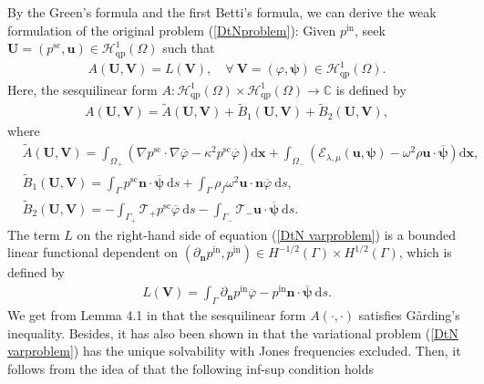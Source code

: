 \documentclass[final,3p,times]{elsarticle}
\begin{document}
By the Green's formula and the first Betti's formula, we can derive the weak formulation of the original problem (\ref{DtNproblem}): Given $p^\mathrm{in}$, seek $\boldsymbol{U}=\left(p^\mathrm{sc}, \boldsymbol{u}\right) \in \mathscr{H}^1_\mathrm{qp}(\Omega)$ such that
\begin{align}\label{DtN varproblem}
	A(\boldsymbol{U}, \boldsymbol{V})=L(\boldsymbol{V}),\quad \forall~ \boldsymbol{V}=(\varphi, \boldsymbol{\psi}) \in \mathscr{H}^1_\mathrm{qp}(\Omega).
\end{align}
Here, the sesquilinear form $A: \mathscr{H}^1_\mathrm{qp}(\Omega) \times \mathscr{H}^1_\mathrm{qp}(\Omega) \rightarrow \mathbb{C}$ is  defined by 
\begin{align}\label{DtN varleft}
	A(\boldsymbol{U}, \boldsymbol{V})
	=\widetilde{A}(\boldsymbol{U}, \boldsymbol{V})
	+ \widetilde{B}_1(\boldsymbol{U}, \boldsymbol{V})
	+ \widetilde{B}_2(\boldsymbol{U}, \boldsymbol{V}),
\end{align}
where
\begin{align*}
	& \widetilde{A}(\boldsymbol{U}, \boldsymbol{V})=\int_{\Omega_+}\left(\nabla p^\mathrm{sc} \cdot \nabla \overline{\varphi}-\kappa^2 p^\mathrm{sc} \overline{\varphi}\right) \mathrm{d} \boldsymbol{x}
	+ \int_{\Omega_-}\left(\mathcal{E}_{\lambda,    \mu}(\boldsymbol{u}, \boldsymbol{\psi})- \omega^2\rho \boldsymbol{u} \cdot \overline{\boldsymbol{\psi}}\right) \mathrm{d} \boldsymbol{x},\\
	& \widetilde{B}_1(\boldsymbol{U}, \boldsymbol{V})
	= \int_{\Gamma} p^\mathrm{sc} \boldsymbol{n} \cdot \overline{\boldsymbol{\psi}} \mathrm{~d}s
	+ \int_{\Gamma} \rho_f \omega^2 \boldsymbol{u} \cdot \boldsymbol{n} \overline{\varphi} \mathrm{~d}s, \\
	& \widetilde{B}_2(\boldsymbol{U}, \boldsymbol{V})=-\int_{\Gamma_+} \mathscr{T}_+ p^\mathrm{sc} \overline{\varphi} \mathrm{~d}s
	- \int_{\Gamma_-} \mathscr{T}_- \boldsymbol{u} \cdot \overline{\boldsymbol{\psi}} \mathrm{~d}s.
\end{align*}
The term $L$ on the right-hand side of equation (\ref{DtN varproblem}) is a bounded linear functional dependent on  $\left(\partial_{\bm{n}} p^\mathrm{in}, p^\mathrm{in} \right) \in H^{-1 / 2}(\Gamma) \times H^{1 / 2}(\Gamma)$, which is defined by
\begin{align}
	L(\boldsymbol{V})=\int_{\Gamma} \partial_{\boldsymbol{n}} p^\mathrm{in} \overline{\varphi}-p^\mathrm{in} \boldsymbol{n} \cdot \overline{\boldsymbol{\psi}} \mathrm{~d}s.
\end{align}
We get from Lemma 4.1 in \cite{Hu16} that the sesquilinear form $A(\cdot, \cdot)$ satisfies  G\aa{}rding's inequality. Besides, it has also been shown in \cite{Hu16} that the variational problem (\ref{DtN varproblem}) has the unique solvability with Jones frequencies excluded. Then, it follows from the idea of  \cite{Hsiao04} that the following inf-sup condition holds
\end{document}
